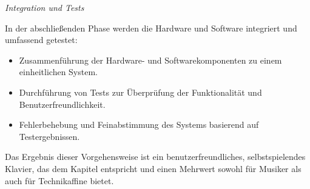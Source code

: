 \textit{Integration und Tests}

In der abschließenden Phase werden die Hardware und Software integriert und umfassend getestet:

\begin{itemize}
    \item Zusammenführung der Hardware- und Softwarekomponenten zu einem einheitlichen System.
    \item Durchführung von Tests zur Überprüfung der Funktionalität und Benutzerfreundlichkeit.
    \item Fehlerbehebung und Feinabstimmung des Systems basierend auf Testergebnissen.
\end{itemize}

Das Ergebnis dieser Vorgehensweise ist ein benutzerfreundliches, selbstspielendes Klavier,
das dem Kapitel  entspricht und einen Mehrwert sowohl für Musiker als auch für Technikaffine bietet.
